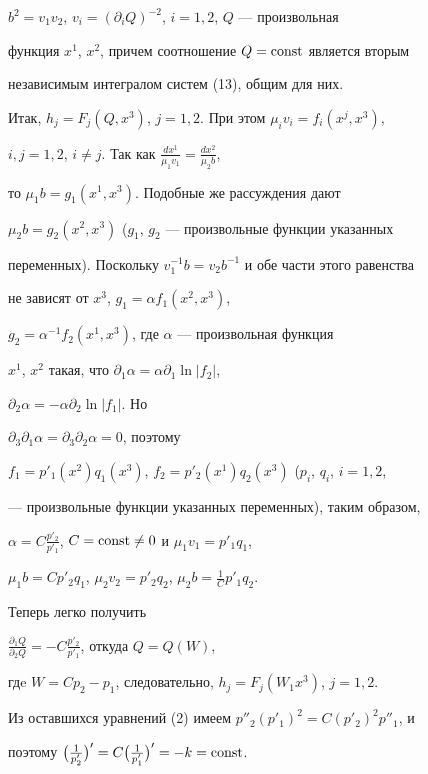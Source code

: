 $b^2=v_1v_2$, $v_i=(\partial_i Q)^{-2}$, $i=1,2$, $Q$ --- произвольная 


функция $x^1$, $x^2$, причем соотношение $Q=\operatorname{const}$ является вторым 


независимым интегралом систем (13), общим для них. 


 


Итак, $h_j=F_j(Q,x^3)$, $j=1,2$. При этом $\mu_i v_i=f_i(x^j,x^3)$, 


$i,j=1,2$, $i\ne j$. Так как $\frac{dx^1}{\mu_1v_1}=\frac{dx^2}{\mu_2b}$, 


то $\mu_1b=g_1(x^1,x^3)$. Подобные же рассуждения дают 


$\mu_2b=g_2(x^2,x^3)$ ($g_1$, $g_2$ --- произвольные функции указанных 


переменных). Поскольку $v^{-1}_1b=v_2b^{-1}$ и обе части этого равенства 


не зависят от $x^3$, $g_1=\alpha f_1(x^2,x^3)$, 


$g_2=\alpha^{-1}f_2(x^1,x^3)$, где $\alpha$ --- произвольная функция 


$x^1$, $x^2$ такая, что $\partial_1\alpha=\alpha\partial_1 \ln|f_2|$, 


$\partial_2\alpha=-\alpha\partial_2\ln|f_1|$. Но 


$\partial_3\partial_1\alpha=\partial_3\partial_2\alpha=0$, поэтому 


$f_1=p'_1(x^2)q_1(x^3)$, $f_2=p'_2(x^1)q_2(x^3)$ ($p_i$, $q_i$, $i=1,2$, 


--- произвольные функции указанных переменных), таким образом, 


$\alpha=C\frac{p'_2}{p'_1}$, $C=\operatorname{const}\ne0$ и $\mu_1v_1=p'_1q_1$, 


$\mu_1b=C p'_2q_1$, $\mu_2v_2=p'_2q_2$, $\mu_2b=\frac{1}{C}p'_1q_2$. 


 


Теперь легко получить 


$\frac{\partial_1Q}{\partial_2Q}=-C\frac{p'_2}{p'_1}$, откуда $Q=Q(W)$, 


гдe $W=C p_2-p_1$, следовательно, $h_j=F_j(W_1x^3)$, $j=1,2$. 


 


Из оставшихся уравнений (2) имеем $p''_2(p'_1)^2=C(p'_2)^2p''_1$, и 


поэтому $\big(\frac{1}{p'_2}\big)'=C\big(\frac{1}{p'_1}\big)'=-k=\operatorname{const}$. 



